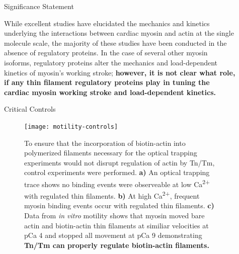 \documentclass[final]{beamer}
\newlength{\sepwidth}
\newlength{\colwidth}
\newcommand{\separatorcolumn}{\begin{column}{\sepwidth}\end{column}}
\begin{document}
\begin{frame}[t]
\begin{columns}[t]
\begin{column}{\colwidth}
\end{column}

\separatorcolumn

\begin{column}{\colwidth}

  \begin{alertblock}{Significance Statement}

    While excellent studies have elucidated the mechanics and kinetics underlying the interactions between cardiac myosin and actin at the single molecule scale, the majority of these studies have been conducted in the absence of regulatory proteins. In the case of several other myosin isoforms, regulatory proteins alter the mechanics and load-dependent kinetics of myosin's working stroke; \textbf{however, it is not clear what role, if any thin filament regulatory proteins play in tuning the cardiac myosin working stroke and load-dependent kinetics.}

  \end{alertblock}

  \begin{block}{Critical Controls}
    \begin{figure}
      \texttt{[image: motility-controls]}
      \caption{To ensure that the incorporation of biotin-actin into polymerized filaments necessary for the optical trapping experiments would not disrupt regulation of actin by Tn/Tm, control experiments were performed. \textbf{a)} An optical trapping trace shows no binding events were observeable at low Ca\textsuperscript{2+} with regulated thin filaments. \textbf{b)} At high Ca\textsuperscript{2+}, frequent myosin binding events occur with regulated thin filaments. \textbf{c)} Data from \textit{in vitro} motility shows that myosin moved bare actin and biotin-actin thin filaments at similiar velocities at pCa 4 and stopped all movement at pCa 9 demonstrating \textbf{Tn/Tm can properly regulate biotin-actin filaments.}}
    \end{figure}

    \end{block}


\end{column}
\end{columns}
\end{frame}
\end{document}
